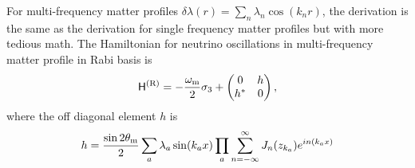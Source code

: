 For multi-frequency matter profiles $\delta \lambda(r) = \sum_n \lambda_n \cos (k_n r)$, the derivation is the same as the derivation for single frequency matter profiles but with more tedious math. The Hamiltonian for neutrino oscillations in multi-frequency matter profile in Rabi basis is
\begin{equation}
    \mathsf H^{(\mathrm R)} = -\frac{\omega_\mathrm m}{2}\sigma_3 + \begin{pmatrix}
        0 & h\\
        h^{*} & 0
        \end{pmatrix},
\end{equation}
where the off diagonal element $h$ is
\begin{equation}
    h = \frac{\sin 2\theta_\mathrm m}{2} \sum_a \lambda_a \sin (k_a x) \prod_{a} \sum_{n=-\infty}^{\infty} J_n (z_{k_a}) e^{i n(k_a x) }
\end{equation}

